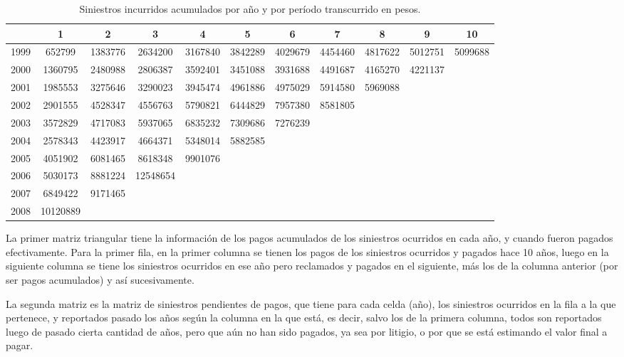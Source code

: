 \documentclass[
  12pt,
]{article}
\begin{document}
\begin{table}[ht]
\centering
\caption{Siniestros incurridos acumulados por año y por período transcurrido en pesos.} 
\label{tabla1}
\begingroup\fontsize{8.5pt}{10pt}\selectfont
\begin{tabular}{ccccccccccc}
  \hline
 & 1 & 2 & 3 & 4 & 5 & 6 & 7 & 8 & 9 & 10 \\ 
  \hline
1999 & 652799 & 1383776 & 2634200 & 3167840 & 3842289 & 4029679 & 4454460 & 4817622 & 5012751 & 5099688 \\ 
  2000 & 1360795 & 2480988 & 2806387 & 3592401 & 3451088 & 3931688 & 4491687 & 4165270 & 4221137 &  \\ 
  2001 & 1985553 & 3275646 & 3290023 & 3945474 & 4961886 & 4975029 & 5914580 & 5969088 &  &  \\ 
  2002 & 2901555 & 4528347 & 4556763 & 5790821 & 6444829 & 7957380 & 8581805 &  &  &  \\ 
  2003 & 3572829 & 4717083 & 5937065 & 6835232 & 7309686 & 7276239 &  &  &  &  \\ 
  2004 & 2578343 & 4423917 & 4664371 & 5348014 & 5882585 &  &  &  &  &  \\ 
  2005 & 4051902 & 6081465 & 8618348 & 9901076 &  &  &  &  &  &  \\ 
  2006 & 5030173 & 8881224 & 12548654 &  &  &  &  &  &  &  \\ 
  2007 & 6849422 & 9171465 &  &  &  &  &  &  &  &  \\ 
  2008 & 10120889 &  &  &  &  &  &  &  &  &  \\ 
   \hline
\end{tabular}
\endgroup
\end{table}

La primer matriz triangular tiene la información de los pagos acumulados
de los siniestros ocurridos en cada año, y cuando fueron pagados
efectivamente. Para la primer fila, en la primer columna se tienen los
pagos de los siniestros ocurridos y pagados hace 10 años, luego en la
siguiente columna se tiene los siniestros ocurridos en ese año pero
reclamados y pagados en el siguiente, más los de la columna anterior
(por ser pagos acumulados) y así sucesivamente.

La segunda matriz es la matriz de siniestros pendientes de pagos, que
tiene para cada celda (año), los siniestros ocurridos en la fila a la
que pertenece, y reportados pasado los años según la columna en la que
está, es decir, salvo los de la primera columna, todos son reportados
luego de pasado cierta cantidad de años, pero que aún no han sido
pagados, ya sea por litigio, o por que se está estimando el valor final
a pagar.
\end{document}
